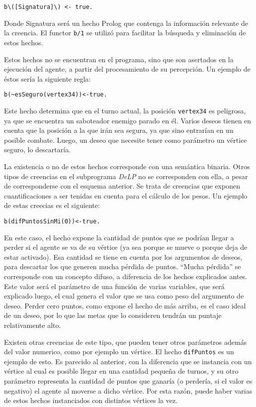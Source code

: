 \documentclass[oneside]{book}
\begin{document}
\begin{verbatim}
b\([Signatura]\) <- true.
\end{verbatim}

Donde Signatura será un hecho Prolog que contenga la información relevante de la 
creencia. El functor \texttt{b/1} se utilizó para facilitar la búsqueda y 
eliminación de estos hechos. 

Estos hechos no se encuentran en el programa, sino que son asertados en la ejecución
del agente, a partir del procesamiento de su percepción. 
Un ejemplo de éstos sería la siguiente regla:

\begin{verbatim}
b(~esSeguro(vertex34))<-true.
\end{verbatim}

Este hecho determina que en el turno actual, la posición \texttt{vertex34} es peligrosa,
ya que se encuentra un saboteador enemigo parado en él. Varios deseos tienen en cuenta
que la posición a la que irán sea segura, ya que sino entrarían en un posible combate.
Luego, un deseo que necesite tener como parámetro un vértice seguro, lo descartaría.

La existencia o no de estos hechos corresponde con una semántica binaria. Otros tipos de
creencias en el subprograma \textit{DeLP} no se corresponden con ella, a pesar de corresponderse
con el esquema anterior. Se trata de creencias que exponen cuantificaciones a ser 
tenidas en cuenta para el cálculo de los pesos. Un ejemplo de estas creecias es el 
siguiente:

\begin{verbatim}
b(difPuntosSinMi(0))<-true.
\end{verbatim}

En este caso, el hecho expone la cantidad de puntos que se podrían llegar a perder si el
agente se va de su vértice (ya sea porque se mueve o porque deja de estar activado). Esa
cantidad se tiene en cuenta por los argumentos de deseos, para descartar los que generen
mucha pérdida de puntos. ``Mucha pérdida'' se corresponde con un concepto difuso, a
diferencia de los hechos explicados antes. Este valor será el parámetro de una función
de varias variables, que será explicado luego, el cual genera el valor que se usa como
peso del argumento de deseo. Perder cero puntos, como expone el hecho de más arriba, es el
caso ideal de un deseo, por lo que las metas que lo consideren tendrán un puntaje
relativamente alto.

Existen otras creencias de este tipo, que pueden tener otros parámetros además del valor
numerico, como por ejemplo un vértice. El hecho \texttt{difPuntos} es un ejemplo de esto.
Es parecido al anterior, con la diferencia que se instancia con un vértice al cual es
posible llegar en una cantidad pequeña de turnos, y su otro parámetro representa la
cantidad de puntos que ganaría (o perdería, si el valor es negativo) el agente al moverse
a dicho vértice. Por esta razón, puede haber varias de estos hechos instanciados con
distintos vértices la vez.
\end{document}

